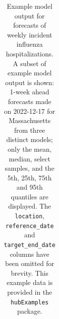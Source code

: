 \documentclass[
]{article}
\begin{document}
\begin{longtable}[]{@{}
  >{\raggedright\arraybackslash}p{}
  >{\raggedright\arraybackslash}p{}
  >{\raggedleft\arraybackslash}p{}
  >{\raggedright\arraybackslash}p{}
  >{\raggedright\arraybackslash}p{}
  >{\raggedleft\arraybackslash}p{}@{}}

\caption{\label{tbl-example-model-outputs}Example model output for
forecasts of weekly incident influenza hospitalizations. A subset of
example model output is shown: 1-week ahead forecasts made on 2022-12-17
for Massachusetts from three distinct models; only the mean, median,
select samples, and the 5th, 25th, 75th and 95th quantiles are
displayed. The \texttt{location}, \texttt{reference\_date} and
\texttt{target\_end\_date} columns have been omitted for brevity. This
example data is provided in the \texttt{hubExamples} package.}

\tabularnewline


\end{longtable}
\end{document}
